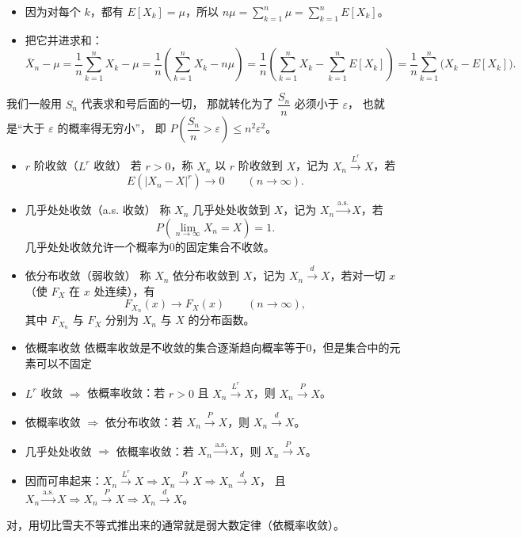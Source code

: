 \begin{itemize}
  \item 因为对每个 $k$，都有 $E[X_k]=\mu$，所以
  $n\mu=\sum_{k=1}^n \mu=\sum_{k=1}^n E[X_k]$。

  \item 把它并进求和：
  \[
  \overline X_n-\mu=\frac1n\sum_{k=1}^n X_k-\mu
  =\frac1n\left(\sum_{k=1}^n X_k-n\mu\right)
  =\frac1n\left(\sum_{k=1}^n X_k-\sum_{k=1}^n E[X_k]\right)
  =\frac1n\sum_{k=1}^n\bigl(X_k-E[X_k]\bigr).
  \]
\end{itemize}
\begin{dxtips}
   我们一般用 $S_n$ 代表求和号后面的一切，
那就转化为了
$\dfrac{S_n}{n}$ 必须小于 $\varepsilon$，
也就是“大于 $\varepsilon$ 的概率得无穷小”，
即
$P\!\left(\dfrac{S_n}{n}>\varepsilon\right)\le n^2\varepsilon^2$。
\end{dxtips}
\begin{itemize}
  \item $r$ 阶收敛（$L^r$ 收敛）  
  若 $r>0$，称 $X_n$ 以 $r$ 阶收敛到 $X$，记为 $X_n\xrightarrow{L^r}X$，若
  \[
  E\!\left(|X_n-X|^r\right)\to 0 \qquad (n\to\infty).
  \]

  \item 几乎处处收敛（a.s. 收敛）  
  称 $X_n$ 几乎处处收敛到 $X$，记为 $X_n\xrightarrow{\mathrm{a.s.}}X$，若
  \[
  P\!\left(\lim_{n\to\infty}X_n=X\right)=1.
  \]
   几乎处处收敛允许一个概率为0的固定集合不收敛。
  \item 依分布收敛（弱收敛）  
  称 $X_n$ 依分布收敛到 $X$，记为 $X_n\xrightarrow{d}X$，若对一切 $x$（使 $F_X$ 在 $x$ 处连续），有
  \[
  F_{X_n}(x)\to F_X(x)\qquad (n\to\infty),
  \]
  其中 $F_{X_n}$ 与 $F_X$ 分别为 $X_n$ 与 $X$ 的分布函数。
  \item 依概率收敛
  依概率收敛是不收敛的集合逐渐趋向概率等于0，但是集合中的元素可以不固定
\end{itemize}
\begin{itemize}
  \item $L^r$ 收敛 $\Rightarrow$ 依概率收敛：若 $r>0$ 且 $X_n\xrightarrow{L^r}X$，则 $X_n\xrightarrow{P}X$。
  
  \item 依概率收敛 $\Rightarrow$ 依分布收敛：若 $X_n\xrightarrow{P}X$，则 $X_n\xrightarrow{d}X$。
  
  \item 几乎处处收敛 $\Rightarrow$ 依概率收敛：若 $X_n\xrightarrow{\mathrm{a.s.}}X$，则 $X_n\xrightarrow{P}X$。
  
  \item 因而可串起来：$X_n\xrightarrow{L^r}X \Rightarrow X_n\xrightarrow{P}X \Rightarrow X_n\xrightarrow{d}X$，
  且 $X_n\xrightarrow{\mathrm{a.s.}}X \Rightarrow X_n\xrightarrow{P}X \Rightarrow X_n\xrightarrow{d}X$。
\end{itemize}
对，用切比雪夫不等式推出来的通常就是弱大数定律（依概率收敛）。

